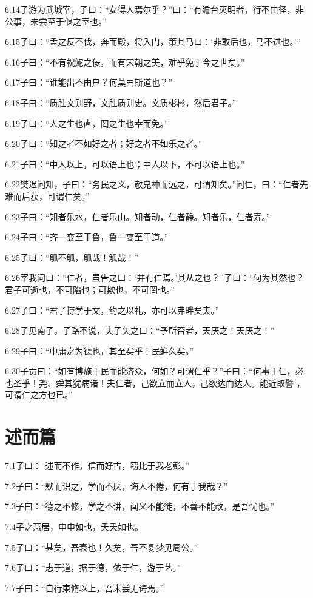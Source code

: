 \documentclass[a4paper,12pt,UTF8,twoside]{ctexbook}
\begin{document}
6.14子游为武城宰，子曰：“女得人焉尔乎？”曰：“有澹台灭明者，行不由径，非公事，未尝至于偃之室也。”

6.15子曰：“孟之反不伐，奔而殿，将入门，策其马曰：‘非敢后也，马不进也。’”

6.16子曰：“不有祝鮀之佞，而有宋朝之美，难乎免于今之世矣。”

6.17子曰：“谁能出不由户？何莫由斯道也？”

6.18子曰：“质胜文则野，文胜质则史。文质彬彬，然后君子。”

6.19子曰：“人之生也直，罔之生也幸而免。”

6.20子曰：“知之者不如好之者；好之者不如乐之者。”

6.21子曰：“中人以上，可以语上也；中人以下，不可以语上也。”

6.22樊迟问知，子曰：“务民之义，敬鬼神而远之，可谓知矣。”问仁，曰：“仁者先难而后获，可谓仁矣。”

6.23子曰：“知者乐水，仁者乐山。知者动，仁者静。知者乐，仁者寿。”

6.24子曰：“齐一变至于鲁，鲁一变至于道。”

6.25子曰：“觚不觚，觚哉！觚哉！”

6.26宰我问曰：“仁者，虽告之曰：‘井有仁焉。’其从之也？”子曰：“何为其然也？君子可逝也，不可陷也；可欺也，不可罔也。”

6.27子曰：“君子博学于文，约之以礼，亦可以弗畔矣夫。”

6.28子见南子，子路不说，夫子矢之曰：“予所否者，天厌之！天厌之！”

6.29子曰：“中庸之为德也，其至矣乎！民鲜久矣。”

6.30子贡曰：“如有博施于民而能济众，何如？可谓仁乎？”子曰：“何事于仁，必也圣乎！尧、舜其犹病诸！夫仁者，己欲立而立人，己欲达而达人。能近取譬
，可谓仁之方也已。”

\chapter{述而篇}
7.1子曰：“述而不作，信而好古，窃比于我老彭。”

7.2子曰：“默而识之，学而不厌，诲人不倦，何有于我哉？”

7.3子曰：“德之不修，学之不讲，闻义不能徙，不善不能改，是吾忧也。”

7.4子之燕居，申申如也，夭夭如也。

7.5子曰：“甚矣，吾衰也！久矣，吾不复梦见周公。”

7.6子曰：“志于道，据于德，依于仁，游于艺。”

7.7子曰：“自行束脩以上，吾未尝无诲焉。”
\end{document}
